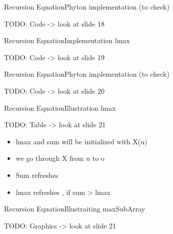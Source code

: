 
\begin{frame}{Recursion Equation}{Phyton implementation (to check)}
	
	TODO: Code -> look at slide 18 \vspace{2em}
	
\end{frame}


\begin{frame}{Recursion Equation}{Implementation lmax}
	
	TODO: Code -> look at slide 19 \vspace{2em}
	
\end{frame}


\begin{frame}{Recursion Equation}{Phyton implementation (to check)}
	
	TODO: Code -> look at slide 20 \vspace{2em}
	
\end{frame}


\begin{frame}{Recursion Equation}{Illustration lmax}
		
		TODO: Table -> look at slide 21 \vspace{2em}
		
	\begin{itemize}
		\item
			lmax and sum will be initialized with X(u)
		\item
			we go through X from u to o
		\item
			Sum refreshes
		\item
			lmax refreshes , if sum > lmax
	\end{itemize}
\end{frame}


\begin{frame}{Recursion Equation}{Illustraiting maxSubArray}
	
	TODO: Graphics -> look at slide 21 \vspace{2em}
	
\end{frame}

